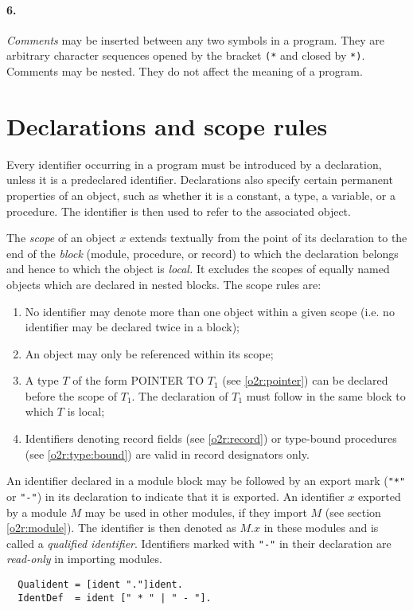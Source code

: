 \paragraph{\rm 6.} {\em Comments} may be inserted between any two
symbols in a program. They are arbitrary character sequences opened
by the bracket \verb|(*| and closed by \verb|*)|.
Comments may be nested. They do not affect the meaning of a program.

\section{Declarations and scope rules}\label{o2r:decls}

Every identifier occurring in a program must be introduced by a declaration,
unless it is a predeclared identifier. Declarations also specify certain
permanent properties of an object, such as whether it is a constant,
a type, a variable, or a procedure. The identifier is then used to
refer to the associated object.

The {\em  scope} of an object $x$ extends textually from the point of
its declaration to the end of the {\em block} (module, procedure,
or record) to which the declaration belongs and hence to which the
object is {\em local.} It excludes the scopes of equally named objects
which are declared in nested blocks. The scope rules are:

\begin{enumerate}
\item
    No identifier may denote more than one object within
    a given scope (i.e. no identifier may be declared twice in a block);
\item
    An object may only be referenced within its scope;
\item
    A type $T$ of the form POINTER TO $T_1$ (see \ref{o2r:pointer})
    can be declared before the scope of $T_1$.
    The declaration of $T_1$ must follow in the same block to which
    $T$ is local;
\item
    Identifiers denoting record fields (see \ref{o2r:record})
    or type-bound procedures (see \ref{o2r:type:bound})
    are valid in record designators only.
\end{enumerate}

\noindent
An identifier declared in a module block may be followed by an export
mark (\verb|"*"| or \verb|"-"|) in its declaration to indicate that
it is exported.
An identifier $x$ exported by a module $M$
may be used in other modules,
if they import $M$ (see section \ref{o2r:module}). The identifier
is then denoted as $M.x$ in these modules and is called a {\em qualified
identifier}. Identifiers marked with \verb|"-"| in their declaration
are {\em read-only} in importing modules.
{\BNFsize
\begin{verbatim}
  Qualident = [ident "."]ident.
  IdentDef  = ident [" * " | " - "].
\end{verbatim}}

